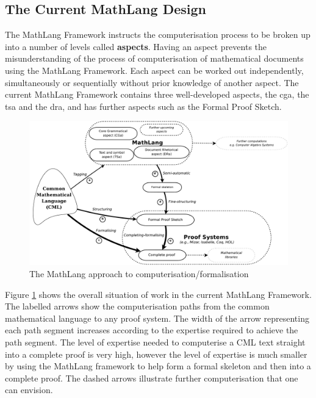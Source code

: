 \subsection{The Current MathLang Design \label{sec:currentmath}}
The MathLang Framework instructs the computerisation process to be broken up into a number of levels called \textbf{aspects}. Having an aspect prevents the misunderstanding of the process of computerisation of mathematical documents using the MathLang Framework. Each aspect can be worked out independently, simultaneously or sequentially without prior knowledge of another aspect. The current MathLang Framework contains three well-developed aspects, the \gls{cga}, the \gls{tsa} and the \gls{dra}, and has further aspects such as the Formal Proof Sketch.

\begin{figure}[H]
\begin{center}
\includegraphics[scale=0.255]{Figures/Background/mathlang.png}
\end{center}
\caption{The MathLang approach to computerisation/formalisation \cite{mathintomizar}\label{fig:mathlang}}
\end{figure}

Figure \ref{fig:mathlang} shows the overall situation of work in the current MathLang Framework.
The labelled arrows show the computerisation paths from the common mathematical language to any proof system. The width of the arrow representing each path segment increases according to the expertise required to achieve the path segment. The level of expertise needed to computerise a CML text straight into a complete proof is very high, however the level of expertise is much smaller by using the MathLang framework to help form a formal skeleton and then into a complete proof. The dashed arrows illustrate further computerisation that one can envision.

